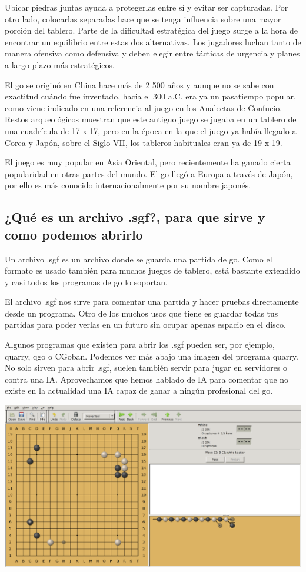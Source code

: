 \documentclass[12pt,a4paper]{report}
\begin{document}
Ubicar piedras juntas ayuda a protegerlas entre sí y evitar ser capturadas. Por
otro lado, colocarlas separadas hace que se tenga influencia sobre una mayor
porción del tablero. Parte de la dificultad estratégica del juego surge a la
hora de encontrar un equilibrio entre estas dos alternativas. Los jugadores
luchan tanto de manera ofensiva como defensiva y deben elegir entre tácticas de
urgencia y planes a largo plazo más estratégicos.

El go se originó en China hace más de 2 500 años y aunque no se sabe con
exactitud cuándo fue inventado, hacia el 300 a.C. era ya un pasatiempo popular,
como viene indicado en una referencia al juego en los Analectas de Confucio.
Restos arqueológicos muestran que este antiguo juego se jugaba en un tablero de
una cuadrícula de 17 x 17, pero en la época en la que el juego ya había llegado
a Corea y Japón, sobre el Siglo VII, los tableros habituales eran ya de 19 x 19.

El juego es muy popular en Asia Oriental, pero recientemente ha ganado cierta
popularidad en otras partes del mundo. El go llegó a Europa a través de Japón,
por ello es más conocido internacionalmente por su nombre japonés.


\subsection{¿Qué es un archivo .sgf?, para que sirve y como podemos abrirlo}

\label{sgf} Un archivo .sgf es un archivo donde se guarda una partida de
go. Como el formato es usado también para muchos juegos de tablero, está
bastante extendido y casi todos los programas de go lo soportan.

El archivo .sgf nos sirve para comentar una partida y hacer pruebas directamente
desde un programa. Otro de los muchos
usos que tiene es guardar todas tus partidas para poder verlas en un futuro sin
ocupar apenas espacio en el disco. 

Algunos programas que existen para abrir los .sgf pueden ser, por ejemplo,
quarry, qgo o CGoban. Podemos ver más abajo una imagen del programa quarry. No
solo sirven para abrir .sgf, suelen también servir para jugar en servidores o
contra una IA. Aprovechamos que hemos hablado de IA para comentar que no existe
en la actualidad una IA capaz de ganar a ningún profesional del go.

\includegraphics[scale=0.33]{quarry.png}
\end{document}
